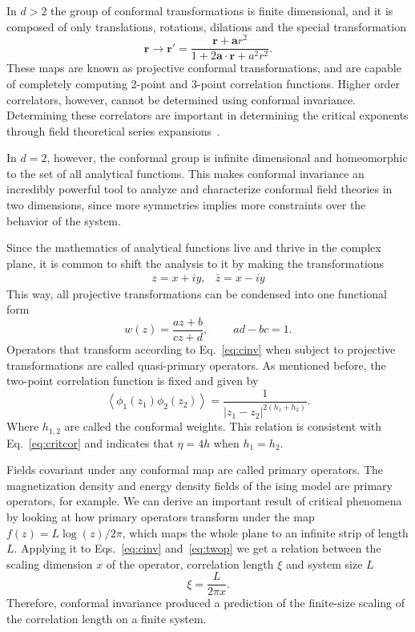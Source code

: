 In $d>2$ the group of conformal transformations is finite dimensional, and
it is composed of only translations, rotations, dilations and the special
transformation
\begin{equation}
    \mathbf{r}\rightarrow\mathbf{r}'=
    \frac{\mathbf{r}+\mathbf{a}r^{2}}{1+2\mathbf{a}\cdot\mathbf{r}+a^{2}r^{2}}.
\end{equation}
These maps are known as projective conformal transformations, and are capable
of completely computing 2-point and 3-point correlation functions. Higher
order correlators, however, cannot be determined using conformal invariance.
Determining these correlators are important in determining the critical
exponents through field theoretical series expansions~\cite{Henkel2013}.

In $d=2$, however, the conformal group is infinite dimensional and homeomorphic
to the set of all analytical functions. This makes conformal invariance an
incredibly powerful tool to analyze and characterize conformal field theories
in two dimensions, since more symmetries implies more constraints over the
behavior of the system.

Since the mathematics of analytical functions live and thrive in the complex
plane, it is common to shift the analysis to it by making the transformations
\begin{equation}
    \begin{array}{cc}
        z=x+iy, & \bar{z}=x-iy
    \end{array}
\end{equation}
This way, all projective transformations can be condensed into one functional
form
\begin{equation}
    w\left(z\right)=\frac{az+b}{cz+d},\;\;\;\;\;\;\;\; ad-bc=1.
\end{equation}
Operators that transform according to Eq.~\ref{eq:cinv} when subject to
projective transformations are called quasi-primary operators.
As mentioned before, the two-point correlation function is fixed and given by
\begin{equation}
    \label{eq:twop}
    \left\langle
        \phi_{1}\left(z_{1}\right)\phi_{2}\left(z_{2}\right)
    \right\rangle =
    \frac{1}{\left|z_{1}-z_{2}\right|^{2(h_{1}+h_{2})}}.
\end{equation}
Where $h_{1,2}$ are called the conformal weights. This relation is consistent
with Eq.~\ref{eq:critcor} and indicates that $\eta=4h$ when $h_1=h_2$.

Fields covariant under any conformal map are called primary operators. The
magnetization density and energy density fields of the ising model are primary
operators, for example. We can derive an important result of critical phenomena
by looking at how primary operators transform under the map
$f(z)=L\log(z)/2\pi$, which maps the whole plane to an infinite strip of length
$L$. Applying it to Eqs.~\ref{eq:cinv} and~\ref{eq:twop} we get a relation
between the scaling dimension $x$ of the operator, correlation length $\xi$ and
system size $L$
\begin{equation}
    \xi=\frac{L}{2\pi x}.
\end{equation}
Therefore, conformal invariance produced a prediction of the finite-size
scaling of the correlation length on a finite system.

